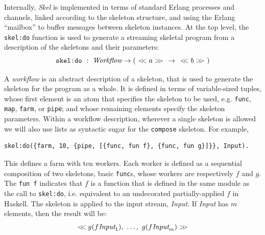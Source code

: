 \documentclass[final]{jfp1}
\newcommand{\stream}[1]{~<\!\!<#1>\!\!>~}
\begin{document}
\noindent 
Internally, \emph{Skel} is implemented in terms of standard Erlang
processes and channels, linked according to the skeleton structure,
and using the Erlang ``mailbox'' to buffer messages between skeleton instances.
At the top level, the \texttt{skel:do} function is used to generate a streaming
skeletal program from a description of the skeletons and their parameters:
$$\texttt{skel:do}~ : ~\emph{Workflow} \rightarrow (\stream{a}~\rightarrow~\stream{b})$$

\noindent
A \emph{workflow} is an abstract description of a skeleton, that is
used to generate the skeleton for the program as a whole.
It is defined in terms of variable-sized tuples, 
whose first element is an atom that specifies the skeleton to be used, e.g. \texttt{func}, \texttt{map},
\texttt{farm}, or \texttt{pipe};
and whose remaining elements specify the skeleton parameters. 
Within a workflow description, wherever a single skeleton is allowed
we will also use lists as syntactic sugar for the \texttt{compose} skeleton.
For example,

\begin{lstlisting}
skel:do({farm, 10, {pipe, [{func, fun f}, {func, fun g}]}}, Input).
\end{lstlisting}

\noindent
This defines a farm with ten workers.  Each worker is defined as a sequential
composition of two skeletons, basic \texttt{func}s, whose workers are
respectively $f$ and $g$. The \texttt{fun f} indicates that $f$ is a
function that is defined in the same module as the call to \texttt{skel:do},
i.e. equivalent to an undecorated partially-applied $f$ in Haskell.  The
skeleton is applied to the input stream, \emph{Input}.  If \emph{Input} has $m$
elements, then the result will be:
$$\stream{ g (f \emph{Input}_1), ~\ldots,~ g (f \emph{Input}_m) }$$
\end{document}
